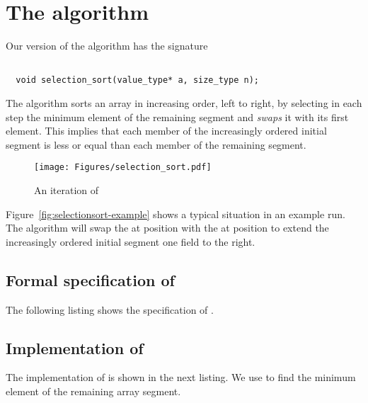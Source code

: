 
\section{The \selectionsort algorithm}

Our version of the \selectionsort algorithm has the signature

\begin{lstlisting}[style = acsl-block]

  void selection_sort(value_type* a, size_type n);
\end{lstlisting}

The \selectionsort algorithm sorts an array in increasing order, left to
right, by selecting in each step the minimum element of the remaining segment
and \emph{swaps} it with its first element.
%
This implies that each member of the increasingly ordered initial segment is less or equal than
each member of the remaining segment.

\begin{figure}[hbt]
\begin{center}
\texttt{[image: Figures/selection\_sort.pdf]}
\caption{An iteration of \selectionsort}
\end{center}
\end{figure}

\FloatBarrier

Figure~\ref{fig:selectionsort-example} shows a typical situation in an
example run.
The algorithm will swap the  at position  with the
 at position  to extend the increasingly ordered initial segment
one field to the right.

\subsection{Formal specification of \selectionsort}

The following listing shows the specification of \selectionsort.



\clearpage


\subsection{Implementation of \selectionsort}

The implementation of \selectionsort is shown in the next listing.
%
We use  to find the minimum element of the remaining array segment.

